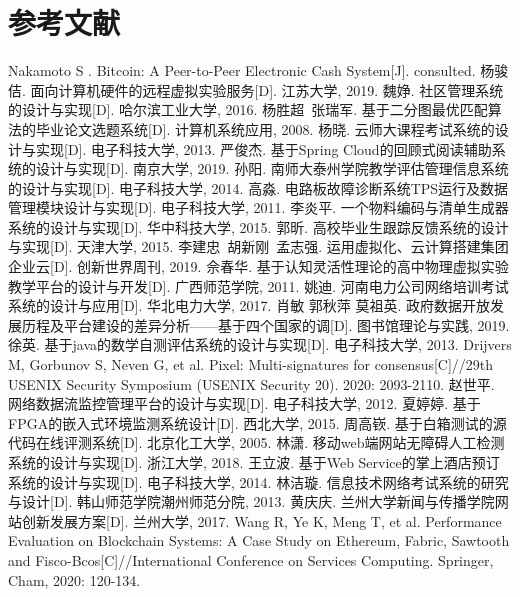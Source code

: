 \section*{参考文献}

\begingroup
\def\section*#1{}

\begin{thebibliography}{99}

Nakamoto S . Bitcoin: A Peer-to-Peer Electronic Cash System[J]. consulted.
杨骏佶. 面向计算机硬件的远程虚拟实验服务[D]. 江苏大学, 2019.
魏婙. 社区管理系统的设计与实现[D]. 哈尔滨工业大学, 2016.
杨胜超~张瑞军. 基于二分图最优匹配算法的毕业论文选题系统[D]. 计算机系统应用, 2008.
杨晓. 云师大课程考试系统的设计与实现[D]. 电子科技大学, 2013.
严俊杰. 基于Spring Cloud的回顾式阅读辅助系统的设计与实现[D]. 南京大学, 2019.
孙阳. 南师大泰州学院教学评估管理信息系统的设计与实现[D]. 电子科技大学, 2014.
高淼. 电路板故障诊断系统TPS运行及数据管理模块设计与实现[D]. 电子科技大学, 2011.
李炎平. 一个物料编码与清单生成器系统的设计与实现[D]. 华中科技大学, 2015.
郭昕. 高校毕业生跟踪反馈系统的设计与实现[D]. 天津大学, 2015.
李建忠~胡新刚~孟志强. 运用虚拟化、云计算搭建集团企业云[D]. 创新世界周刊, 2019.
佘春华. 基于认知灵活性理论的高中物理虚拟实验教学平台的设计与开发[D]. 广西师范学院, 2011.
姚迪. 河南电力公司网络培训考试系统的设计与应用[D]. 华北电力大学, 2017.
肖敏 郭秋萍 莫祖英. 政府数据开放发展历程及平台建设的差异分析——基于四个国家的调[D]. 图书馆理论与实践, 2019.
徐英. 基于java的数学自测评估系统的设计与实现[D]. 电子科技大学, 2013.
Drijvers M, Gorbunov S, Neven G, et al. Pixel: Multi-signatures for consensus[C]//29th {USENIX} Security Symposium ({USENIX} Security 20). 2020: 2093-2110.
赵世平. 网络数据流监控管理平台的设计与实现[D]. 电子科技大学, 2012.
夏婷婷. 基于FPGA的嵌入式环境监测系统设计[D]. 西北大学, 2015.
周高嵚. 基于白箱测试的源代码在线评测系统[D]. 北京化工大学, 2005.
林潇. 移动web端网站无障碍人工检测系统的设计与实现[D]. 浙江大学, 2018.
王立波. 基于Web Service的掌上酒店预订系统的设计与实现[D]. 电子科技大学, 2014.
林洁璇. 信息技术网络考试系统的研究与设计[D]. 韩山师范学院潮州师范分院, 2013.
黄庆庆. 兰州大学新闻与传播学院网站创新发展方案[D]. 兰州大学, 2017.
Wang R, Ye K, Meng T, et al. Performance Evaluation on Blockchain Systems: A Case Study on Ethereum, Fabric, Sawtooth and Fisco-Bcos[C]//International Conference on Services Computing. Springer, Cham, 2020: 120-134.

\end{thebibliography}

\endgroup
\clearpage
